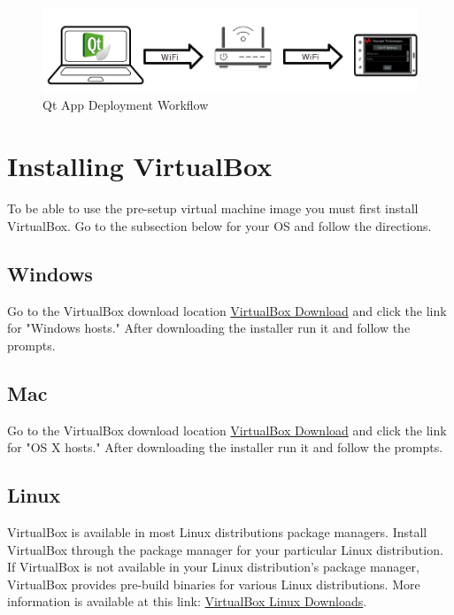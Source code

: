 \documentclass{article}
\begin{document}
	\begin{figure}[H]
		\centering
		\includegraphics[scale=0.5]{pics/Deployment_Workflow.png}
		\caption{Qt App Deployment Workflow}
		\label{Qt_App_Deployment}
	\end{figure}



\section{Installing VirtualBox}

To be able to use the pre-setup virtual machine image you must first install VirtualBox. Go to the subsection below for your OS and follow the directions.


	\subsection{Windows}
	
	Go to the VirtualBox download location \href{https://www.virtualbox.org/wiki/Downloads}{VirtualBox Download} and click the link for "Windows hosts." After downloading the installer run it and follow the prompts.
	
	\subsection{Mac}
	
	Go to the VirtualBox download location \href{https://www.virtualbox.org/wiki/Downloads}{VirtualBox Download} and click the link for "OS X hosts." After downloading the installer run it and follow the prompts.
	
	\subsection{Linux}
	
	VirtualBox is available in most Linux distributions package managers. Install VirtualBox through the package manager for your particular Linux distribution. If VirtualBox is not available in your Linux distribution's package manager, VirtualBox provides pre-build binaries for various Linux distributions. More information is available at this link: \href{https://www.virtualbox.org/wiki/Linux_Downloads}{VirtualBox Linux Downloads}.
\end{document}
